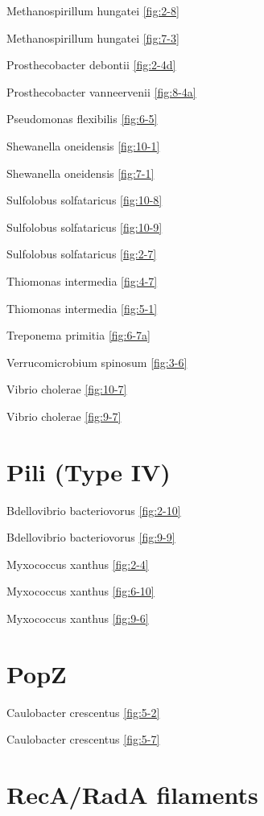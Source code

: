 \documentclass[]{tufte-book}
\begin{document}
Methanospirillum hungatei \ref{fig:2-8}

Methanospirillum hungatei \ref{fig:7-3}

Prosthecobacter debontii \ref{fig:2-4d}

Prosthecobacter vanneervenii \ref{fig:8-4a}

Pseudomonas flexibilis \ref{fig:6-5}

Shewanella oneidensis \ref{fig:10-1}

Shewanella oneidensis \ref{fig:7-1}

Sulfolobus solfataricus \ref{fig:10-8}

Sulfolobus solfataricus \ref{fig:10-9}

Sulfolobus solfataricus \ref{fig:2-7}

Thiomonas intermedia \ref{fig:4-7}

Thiomonas intermedia \ref{fig:5-1}

Treponema primitia \ref{fig:6-7a}

Verrucomicrobium spinosum \ref{fig:3-6}

Vibrio cholerae \ref{fig:10-7}

Vibrio cholerae \ref{fig:9-7}

\section*{Pili (Type IV)}\label{pili-type-iv}

Bdellovibrio bacteriovorus \ref{fig:2-10}

Bdellovibrio bacteriovorus \ref{fig:9-9}

Myxococcus xanthus \ref{fig:2-4}

Myxococcus xanthus \ref{fig:6-10}

Myxococcus xanthus \ref{fig:9-6}

\section*{PopZ}\label{popz}

Caulobacter crescentus \ref{fig:5-2}

Caulobacter crescentus \ref{fig:5-7}

\section*{RecA/RadA filaments}\label{recarada-filaments}
\end{document}
